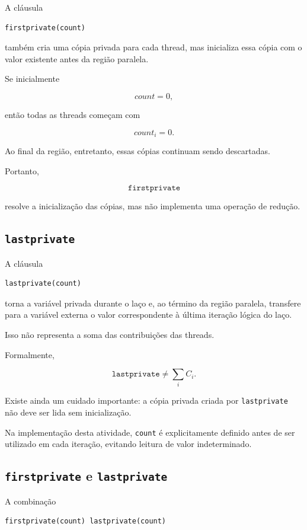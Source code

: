 A cláusula

\begin{verbatim}
firstprivate(count)
\end{verbatim}

também cria uma cópia privada para cada thread, mas inicializa essa cópia
com o valor existente antes da região paralela.

Se inicialmente

\[
count=0,
\]

então todas as threads começam com

\[
count_i=0.
\]

Ao final da região, entretanto, essas cópias continuam sendo descartadas.

Portanto,

\[
\texttt{firstprivate}
\]

resolve a inicialização das cópias, mas não implementa uma operação de
redução.


\subsection{\texttt{lastprivate}}

A cláusula

\begin{verbatim}
lastprivate(count)
\end{verbatim}

torna a variável privada durante o laço e, ao término da região paralela,
transfere para a variável externa o valor correspondente à última iteração
lógica do laço.

Isso não representa a soma das contribuições das threads.

Formalmente,

\[
\texttt{lastprivate}
\neq
\sum_i C_i.
\]

Existe ainda um cuidado importante: a cópia privada criada por
\texttt{lastprivate} não deve ser lida sem inicialização.

Na implementação desta atividade, \texttt{count} é explicitamente definido
antes de ser utilizado em cada iteração, evitando leitura de valor
indeterminado.


\subsection{\texttt{firstprivate} e \texttt{lastprivate}}

A combinação

\begin{verbatim}
firstprivate(count) lastprivate(count)
\end{verbatim}

